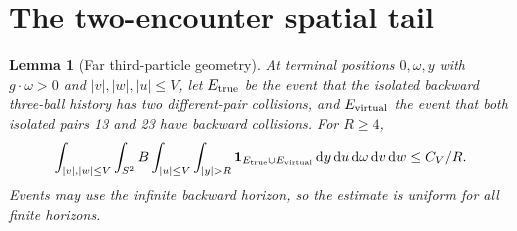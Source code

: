 \documentclass[11pt,letterpaper]{article}
\newtheorem{lemma}[theorem]{Lemma}
\theoremstyle{remark}\newtheorem{remark}[theorem]{Remark}
\numberwithin{equation}{section}
\begin{document}
\section{The two-encounter spatial tail}\label{sec:tail}
\begin{lemma}[Far third-particle geometry]\label{lem:geometry}
At terminal positions $0,\omega,y$ with $g\cdot\omega>0$ and $|v|,|w|,|u|\le V$, let $E_{\rm true}$ be the event that the isolated backward three-ball history has two different-pair collisions, and $E_{\rm virtual}$ the event that both isolated pairs 13 and 23 have backward collisions. For $R\ge4$,
\begin{equation}\label{eq:tailgeom}
 \int_{|v|,|w|\le V}\int_{S^2}B
 \int_{|u|\le V}\int_{|y|>R}\ind_{E_{\rm true}\cup E_{\rm virtual}}
                       \dd y\dd u\dd\omega\dd v\dd w\le C_V/R.
\end{equation}
Events may use the infinite backward horizon, so the estimate is uniform for all finite horizons.
\end{lemma}
\end{document}
